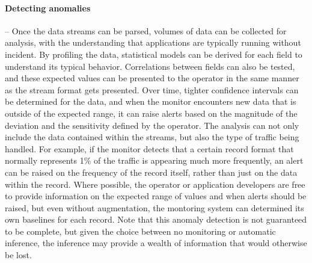 \paragraph*{Detecting anomalies} -- Once the data streams can be parsed,
volumes of data can be collected for analysis, with the understanding
that applications are typically running without incident. By profiling
the data, statistical models can be derived for each field to
understand its typical behavior. Correlations between fields can also
be tested, and these expected values can be presented to the operator
in the same manner as the stream format gets presented. Over time,
tighter confidence intervals can be determined for the data, and when
the monitor encounters new data that is outside of the expected range,
it can raise alerts based on the magnitude of the deviation and the
sensitivity defined by the operator. The analysis can not only include
the data contained within the streams, but also the type of traffic
being handled. For example, if the monitor detects that a certain
record format that normally represents 1\% of the traffic is appearing
much more frequently, an alert can be raised on the frequency of the
record itself, rather than just on the data within the record. Where
possible, the operator or application developers are free to provide
information on the expected range of values and when alerts should be
raised, but even without augmentation, the montoring system can
determined its own baselines for each record. Note that this anomaly
detection is not guaranteed to be complete, but given the choice
between no monitoring or automatic inference, the inference may
provide a wealth of information that would otherwise be lost.

